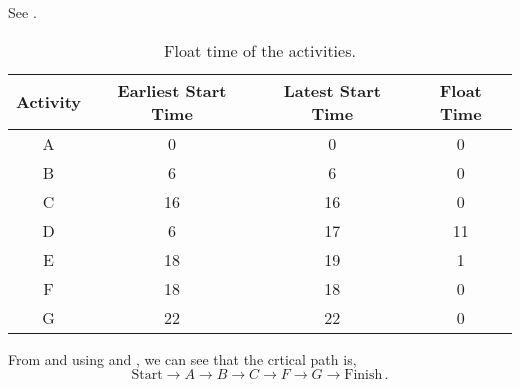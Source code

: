 \begin{subquestions}
\begin{subsubquestions}
\subsubquestion

See .
\begin{table}[ht]
	\centering
	\begin{tabular}{|c|c|c|c|}
		\hline
		Activity & Earliest Start Time & Latest Start Time & Float Time \\
		\hline
		A & 0 & 0 & 0 \\
		B & 6 & 6 & 0 \\
		C & 16 & 16 & 0 \\
		D & 6 & 17 & 11 \\
		E & 18 & 19 & 1 \\
		F & 18 & 18 & 0 \\
		G & 22 & 22 & 0 \\
		\hline
	\end{tabular}
	\caption{\label{2011:q2:tab:CritPath} Float time of the activities.}
\end{table}


\subsubquestion

From  and using  and , we can see that the crtical path is,
\begin{equation}
	\text{Start} \rightarrow A \rightarrow B \rightarrow C \rightarrow F \rightarrow G \rightarrow \text{Finish}\,.
\end{equation}

\end{subsubquestions}

\end{subquestions}


